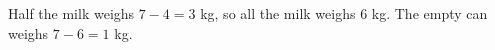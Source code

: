 Half the milk weighs $7-4=3$ kg, so all the milk weighs $6$ kg. The empty can weighs $7-6=\boxed1$ kg.
